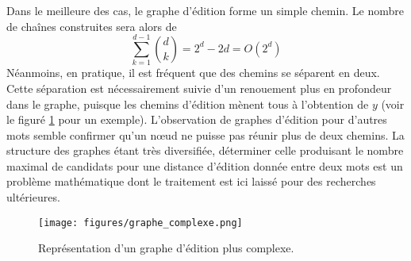 \documentclass[12pt, twoside]{report}
\begin{document}
Dans le meilleure des cas, le graphe d'édition forme un simple chemin. Le nombre de chaînes construites sera alors de
\begin{equation}
    \sum_{k=1}^{d-1} {{d}\choose{k}} = 2^d - 2d = O(2^d)
\end{equation}
Néanmoins, en pratique, il est fréquent que des chemins se séparent en deux. Cette séparation est nécessairement suivie d'un renouement plus en profondeur dans le graphe, puisque les chemins d'édition mènent tous à l'obtention de $y$ (voir le figuré \ref{fig:complex_graph} pour un exemple). L'observation de graphes d'édition pour d'autres mots semble confirmer qu'un n\oe{}ud ne puisse pas réunir plus de deux chemins. La structure des graphes étant très diversifiée, déterminer celle produisant le nombre maximal de candidats pour une distance d'édition donnée entre deux mots est un problème mathématique dont le traitement est ici laissé pour des recherches ultérieures. %

\begin{figure}[h]{} \label{fig:complex_graph}
    \centering
    \texttt{[image: figures/graphe\_complexe.png]}
    \caption{Représentation d'un graphe d'édition plus complexe.}
\end{figure}
\end{document}
